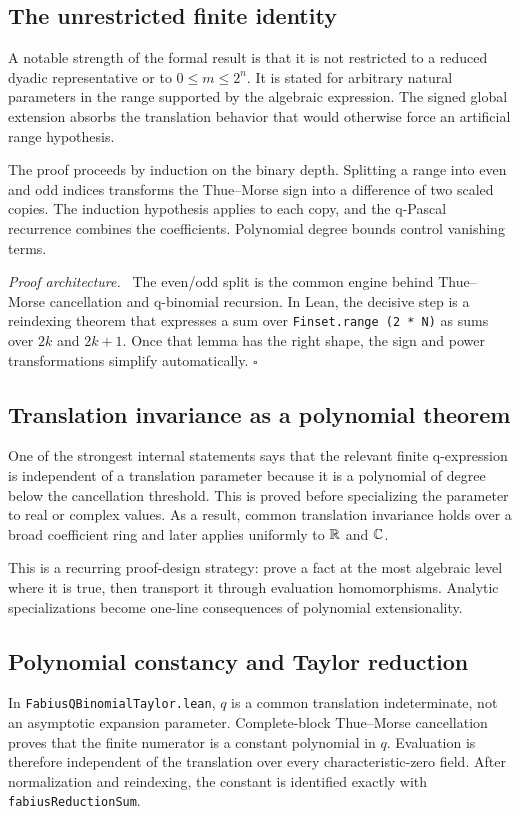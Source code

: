 \documentclass[11pt,oneside]{article}
\theoremstyle{definition}
\theoremstyle{remark}
\newenvironment{proofidea}{\par\smallskip\noindent\textit{Proof architecture.}\ }{\hfill$\square$\par\smallskip}
\begin{document}
\subsection{The unrestricted finite identity}
A notable strength of the formal result is that it is not restricted to a reduced dyadic representative or to \(0\leq m\leq2^n\).  It is stated for arbitrary natural parameters in the range supported by the algebraic expression.  The signed global extension absorbs the translation behavior that would otherwise force an artificial range hypothesis.

The proof proceeds by induction on the binary depth.  Splitting a range into even and odd indices transforms the Thue--Morse sign into a difference of two scaled copies.  The induction hypothesis applies to each copy, and the q-Pascal recurrence combines the coefficients.  Polynomial degree bounds control vanishing terms.

\begin{proofidea}
The even/odd split is the common engine behind Thue--Morse cancellation and q-binomial recursion.  In Lean, the decisive step is a reindexing theorem that expresses a sum over \nolinkurl{Finset.range (2 * N)} as sums over \(2k\) and \(2k+1\).  Once that lemma has the right shape, the sign and power transformations simplify automatically.
\end{proofidea}

\subsection{Translation invariance as a polynomial theorem}
One of the strongest internal statements says that the relevant finite q-expression is independent of a translation parameter because it is a polynomial of degree below the cancellation threshold.  This is proved before specializing the parameter to real or complex values.  As a result, common translation invariance holds over a broad coefficient ring and later applies uniformly to \(\mathbb{R}\) and \(\mathbb{C}\).

This is a recurring proof-design strategy: prove a fact at the most algebraic level where it is true, then transport it through evaluation homomorphisms.  Analytic specializations become one-line consequences of polynomial extensionality.

\subsection{Polynomial constancy and Taylor reduction}
In \nolinkurl{FabiusQBinomialTaylor.lean}, \(q\) is a common translation indeterminate, not an asymptotic expansion parameter.  Complete-block Thue--Morse cancellation proves that the finite numerator is a constant polynomial in \(q\).  Evaluation is therefore independent of the translation over every characteristic-zero field.  After normalization and reindexing, the constant is identified exactly with \nolinkurl{fabiusReductionSum}.
\end{document}
